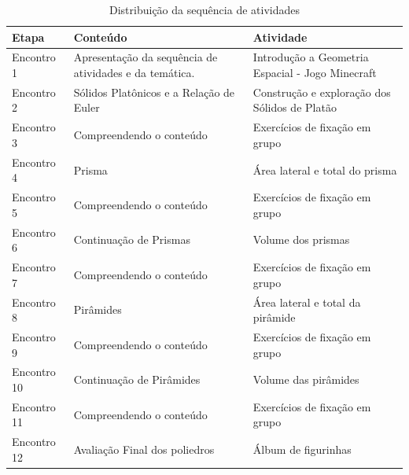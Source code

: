 \begin{table}[htbp] \centering
    \caption{Distribuição da sequência de atividades} \label{tab:Elaboração de sequência de atividades}
    \begin{tabularx}{\textwidth}{|p{3cm}|X|X|}
        \hline
        \textbf{Etapa} & \textbf{Conteúdo}                                      & \textbf{Atividade}                               \\ \hline
        Encontro 1     & Apresentação da sequência de atividades e da temática. & Introdução a Geometria Espacial - Jogo Minecraft \\ \hline
        Encontro 2     & Sólidos Platônicos e a Relação de Euler                & Construção e exploração dos Sólidos de Platão    \\ \hline
        Encontro 3     & Compreendendo o conteúdo                               & Exercícios de fixação em grupo                   \\ \hline
        Encontro 4     & Prisma                                                 & Área lateral e total do prisma                   \\ \hline
        Encontro 5     & Compreendendo o conteúdo                               & Exercícios de fixação em grupo                   \\ \hline
        Encontro 6     & Continuação de Prismas                                 & Volume dos prismas                               \\ \hline
        Encontro 7     & Compreendendo o conteúdo                               & Exercícios de fixação em grupo                   \\ \hline
        Encontro 8     & Pirâmides                                              & Área lateral e total da pirâmide                 \\ \hline
        Encontro 9     & Compreendendo o conteúdo                               & Exercícios de fixação em grupo                   \\ \hline
        Encontro 10    & Continuação de Pirâmides                               & Volume das pirâmides                             \\ \hline
        Encontro 11    & Compreendendo o conteúdo                               & Exercícios de fixação em grupo                   \\ \hline
        Encontro 12    & Avaliação Final dos poliedros                          & Álbum de figurinhas                              \\ \hline
    \end{tabularx}
    \legend{\legendaTabela}
\end{table}

